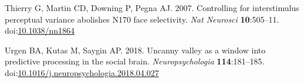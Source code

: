 \documentclass[
]{article}
\newlength{\cslhangindent}
\newlength{\cslentryspacingunit} %
\newenvironment{CSLReferences}[2] %
 {%
  \setlength{\parindent}{0pt}
  \ifodd #1
  \let\oldpar\par
  \def\par{\hangindent=\cslhangindent\oldpar}
  \fi
  \setlength{\parskip}{#2\cslentryspacingunit}
 }%
 {}
\begin{document}
\begin{CSLReferences}{1}{0}
\leavevmode{}%
Thierry G, Martin CD, Downing P, Pegna AJ. 2007. Controlling for interstimulus perceptual variance abolishes N170 face selectivity. \emph{Nat Neurosci} \textbf{10}:505--11. doi:\href{https://doi.org/10.1038/nn1864}{10.1038/nn1864}

\leavevmode{}%
Urgen BA, Kutas M, Saygin AP. 2018. Uncanny valley as a window into predictive processing in the social brain. \emph{Neuropsychologia} \textbf{114}:181--185. doi:\href{https://doi.org/10.1016/j.neuropsychologia.2018.04.027}{10.1016/j.neuropsychologia.2018.04.027}

\end{CSLReferences}
\end{document}

